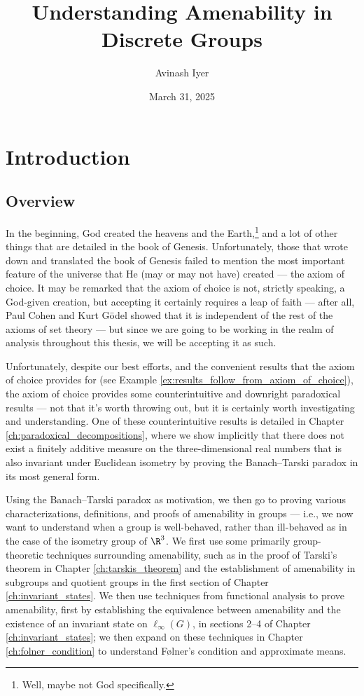 \documentclass[11pt]{package2}
\title{Understanding Amenability in Discrete Groups\\\vspace{5pt}{\large A Gentle Introduction to Higher Analysis}}
\author{Avinash Iyer}
\date{March 31, 2025}
\begin{document}
\maketitle
\RaggedRight
\tableofcontents
\chapter{Introduction}
\section{Overview}%
In the beginning, God created the heavens and the Earth,\footnote{Well, maybe not God specifically.} and a lot of other things that are detailed in the book of Genesis. Unfortunately, those that wrote down and translated the book of Genesis failed to mention the most important feature of the universe that He (may or may not have) created --- the axiom of choice. It may be remarked that the axiom of choice is not, strictly speaking, a God-given creation, but accepting it certainly requires a leap of faith --- after all, Paul Cohen and Kurt Gödel showed that it is independent of the rest of the axioms of set theory --- but since we are going to be working in the realm of analysis throughout this thesis, we will be accepting it as such.\newline

Unfortunately, despite our best efforts, and the convenient results that the axiom of choice provides for (see Example \ref{ex:results_follow_from_axiom_of_choice}), the axiom of choice provides some counterintuitive and downright paradoxical results --- not that it's worth throwing out, but it is certainly worth investigating and understanding. One of these counterintuitive results is detailed in Chapter \ref{ch:paradoxical_decompositions}, where we show implicitly that there does not exist a finitely additive measure on the three-dimensional real numbers that is also invariant under Euclidean isometry by proving the Banach--Tarski paradox in its most general form.\newline

Using the Banach--Tarski paradox as motivation, we then go to proving various characterizations, definitions, and proofs of amenability in groups --- i.e., we now want to understand when a group is well-behaved, rather than ill-behaved as in the case of the isometry group of $\R^3$. We first use some primarily group-theoretic techniques surrounding amenability, such as in the proof of Tarski's theorem in Chapter \ref{ch:tarskis_theorem} and the establishment of amenability in subgroups and quotient groups in the first section of Chapter \ref{ch:invariant_states}. We then use techniques from functional analysis to prove amenability, first by establishing the equivalence between amenability and the existence of an invariant state on $\ell_{\infty}(G)$, in sections 2--4 of Chapter \ref{ch:invariant_states}; we then expand on these techniques in Chapter \ref{ch:folner_condition} to understand Følner's condition and approximate means.\newline
\end{document}
